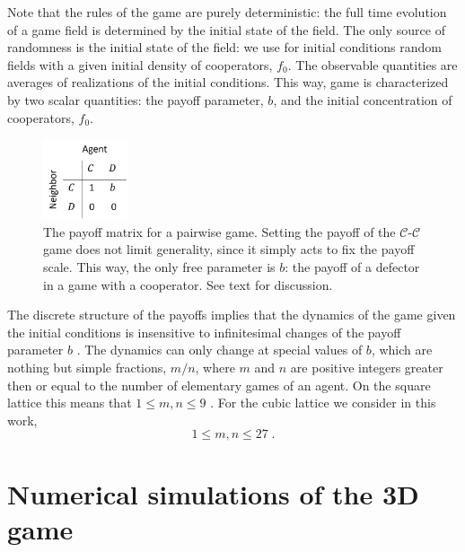\documentclass[a4paper]{jpconf}
\begin{document}
Note that the rules of the game are purely deterministic: the full time
evolution of a game field is determined by the initial state of the field. 
The only source of randomness is the initial state of the field: we use for initial
conditions random fields with a given initial density of cooperators, $f_0$.
The observable quantities are averages of realizations of the initial conditions.
This way, game is characterized by two scalar quantities: the payoff parameter, $b$,
and the initial concentration of cooperators, $f_0$.

\begin{figure}[htb]
\begin{center}
\includegraphics[width=0.22\textwidth]{Game_score_table.png}
\caption{The payoff matrix for a pairwise game. Setting the payoff of the
$\mathcal{C}$-$\mathcal{C}$ game does not limit generality, since it simply acts
to fix the payoff scale. This way, the only free parameter is $b$: the payoff of
a defector in a game with a cooperator. 
See text for discussion.}	
\label{fig:score-table}	
\end{center}
\end{figure}


The discrete structure of the payoffs implies that the dynamics of the game given
the initial conditions is insensitive to infinitesimal changes of the payoff parameter $b$ \cite{Nowak1992}.
The dynamics can only change at special values of $b$, which are nothing but simple fractions, $m/n$, 
where $m$ and $n$ are positive integers greater then or equal to the number of elementary games of an agent.
On the square lattice this means that $1 \leqslant m, n \leqslant 9$ \cite{Nowak1992}. For the cubic lattice we consider in this work, 
%
\begin{equation}
1 \leqslant m, n \leqslant 27\;.
\label{mn}
\end{equation}


\section{Numerical simulations of the 3D game}
\label{sec:3D}
\end{document}
